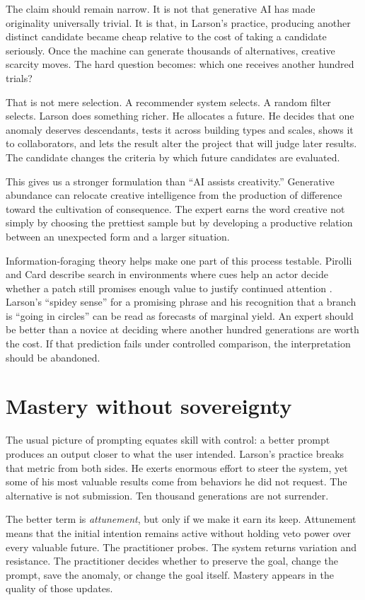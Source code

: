 \documentclass[11pt]{article}
\begin{document}
The claim should remain narrow. It is not that generative AI has made originality universally trivial. It is that, in Larson's practice, producing another distinct candidate became cheap relative to the cost of taking a candidate seriously. Once the machine can generate thousands of alternatives, creative scarcity moves. The hard question becomes: which one receives another hundred trials?

That is not mere selection. A recommender system selects. A random filter selects. Larson does something richer. He allocates a future. He decides that one anomaly deserves descendants, tests it across building types and scales, shows it to collaborators, and lets the result alter the project that will judge later results. The candidate changes the criteria by which future candidates are evaluated.

This gives us a stronger formulation than ``AI assists creativity.'' Generative abundance can relocate creative intelligence from the production of difference toward the cultivation of consequence. The expert earns the word creative not simply by choosing the prettiest sample but by developing a productive relation between an unexpected form and a larger situation.

Information-foraging theory helps make one part of this process testable. Pirolli and Card describe search in environments where cues help an actor decide whether a patch still promises enough value to justify continued attention \cite{PirolliCard1999}. Larson's ``spidey sense'' for a promising phrase and his recognition that a branch is ``going in circles'' can be read as forecasts of marginal yield. An expert should be better than a novice at deciding where another hundred generations are worth the cost. If that prediction fails under controlled comparison, the interpretation should be abandoned.

\section{Mastery without sovereignty}
The usual picture of prompting equates skill with control: a better prompt produces an output closer to what the user intended. Larson's practice breaks that metric from both sides. He exerts enormous effort to steer the system, yet some of his most valuable results come from behaviors he did not request. The alternative is not submission. Ten thousand generations are not surrender.

The better term is \emph{attunement}, but only if we make it earn its keep. Attunement means that the initial intention remains active without holding veto power over every valuable future. The practitioner probes. The system returns variation and resistance. The practitioner decides whether to preserve the goal, change the prompt, save the anomaly, or change the goal itself. Mastery appears in the quality of those updates.
\end{document}
